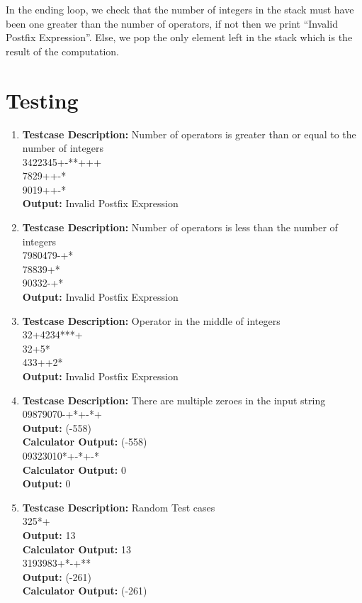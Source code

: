 \documentclass[a4paper]{article}
\begin{document}
In the ending loop, we check that the number of integers in the stack must have been one greater than the number of operators, if not then we print “Invalid Postfix Expression”. Else, we pop the only element left in the stack which is the result of the computation.\\

\newpage
\section{Testing}



\begin{enumerate}
\item \textbf{Testcase Description:} Number of operators is greater than or equal to the number of integers\\
3422345+-**+++\\
7829++-*\\
9019++-*\\
\textbf{Output:} Invalid Postfix Expression\\
\item  \textbf{Testcase Description:} Number of operators is less than the number of integers \\
7980479-+*\\
78839+*\\
90332-+*\\
\textbf{Output:} Invalid Postfix Expression\\
\item \textbf{Testcase Description:} Operator in the middle of integers\\
32+4234***+\\
32+5*\\
433++2*\\
\textbf{Output:} Invalid Postfix Expression\\
\item \textbf{Testcase Description:} There are multiple zeroes in the input string \\
09879070-+*+-*+\\
\textbf{Output:} (-558)\\
\textbf{Calculator Output:} (-558)\\
09323010*+-*+-*\\
\textbf{Calculator Output: }0\\
\textbf{Output:} 0\\
\item \textbf{Testcase Description:} Random Test cases \\
325*+\\
\textbf{Output:} 13\\
\textbf{Calculator Output: }13\\
3193983+*-+**\\
\textbf{Output: }(-261)\\
\textbf{Calculator Output:} (-261)\\
\end{enumerate}
\end{document}
